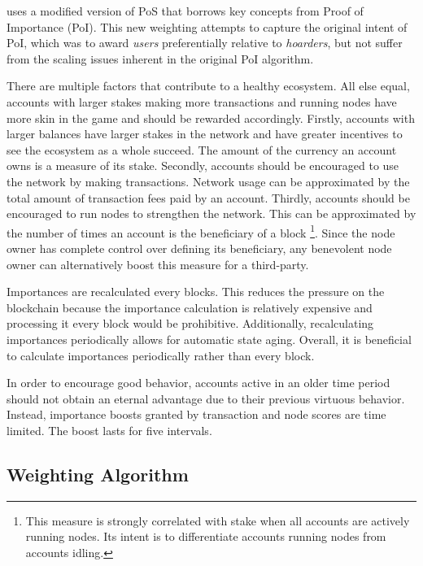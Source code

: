 \codenamespace uses a modified version of PoS that borrows key concepts from Proof of Importance (PoI).
This new weighting attempts to capture the original intent of PoI, which was to award \emph{users} preferentially relative to \emph{hoarders}, but not suffer from the scaling issues inherent in the original PoI algorithm.

There are multiple factors that contribute to a healthy ecosystem.
All else equal, accounts with larger stakes making more transactions and running nodes have more skin in the game and should be rewarded accordingly.
Firstly, accounts with larger balances have larger stakes in the network and have greater incentives to see the ecosystem as a whole succeed.
The amount of the currency an account owns is a measure of its stake.
Secondly, accounts should be encouraged to use the network by making transactions.
Network usage can be approximated by the total amount of transaction fees paid by an account.
Thirdly, accounts should be encouraged to run nodes to strengthen the network.
This can be approximated by the number of times an account is the beneficiary of a block
\footnote{
	This measure is strongly correlated with stake when all accounts are actively running nodes.
	Its intent is to differentiate accounts running nodes from accounts idling.
}.
Since the node owner has complete control over defining its beneficiary, any benevolent node owner can alternatively boost this measure for a third-party.

Importances are recalculated every  blocks.
This reduces the pressure on the blockchain because the importance calculation is relatively expensive and processing it every block would be prohibitive.
Additionally, recalculating importances periodically allows for automatic state aging.
Overall, it is beneficial to calculate importances periodically rather than every block.

In order to encourage good behavior, accounts active in an older time period should not obtain an eternal advantage due to their previous virtuous behavior.
Instead, importance boosts granted by transaction and node scores are time limited.
The boost lasts for five  intervals.

\subsection{Weighting Algorithm}
\label{sec:consensus:weighting}


